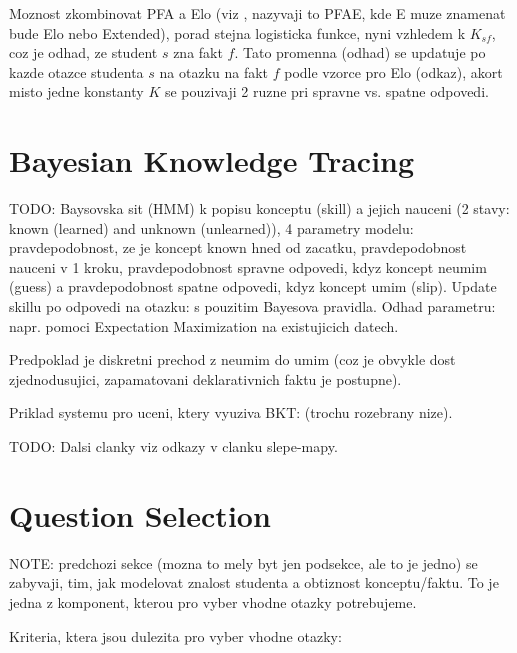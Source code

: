 \documentclass[a4paper, 12pt, twoside]{fithesis2}		%
\renewcommand{\_}{\leavevmode \kern0.0em\vbox{\hrule width0.4em}}
\begin{document}
Moznost zkombinovat PFA a Elo (viz \cite{slepe-mapy}, nazyvaji to PFAE, kde E muze znamenat bude Elo nebo Extended), porad stejna logisticka funkce, nyni vzhledem k $K_{sf}$, coz je odhad, ze student $s$ zna fakt $f$. Tato promenna (odhad) se updatuje po kazde otazce studenta $s$ na otazku na fakt $f$ podle vzorce pro Elo (odkaz), akort misto jedne konstanty $K$ se pouzivaji 2 ruzne pri spravne vs. spatne odpovedi.


\section{Bayesian Knowledge Tracing}
\label{sec:bayesian-network}

TODO: Baysovska sit (HMM) k popisu konceptu (skill) a jejich nauceni (2 stavy: known (learned) and unknown (unlearned)), 4 parametry modelu: pravdepodobnost, ze je koncept known hned od zacatku, pravdepodobnost nauceni v 1 kroku, pravdepodobnost spravne odpovedi, kdyz koncept neumim (guess) a pravdepodobnost spatne odpovedi, kdyz koncept umim (slip).
Update skillu po odpovedi na otazku: s pouzitim Bayesova pravidla.
Odhad parametru: napr. pomoci Expectation Maximization na existujicich datech.

Predpoklad je diskretni prechod z neumim do umim (coz je obvykle dost zjednodusujici, zapamatovani deklarativnich faktu je postupne).

Priklad systemu pro uceni, ktery vyuziva BKT: \cite{question-gen-adapt-bayes} (trochu rozebrany nize).

TODO: Dalsi clanky viz odkazy v clanku slepe-mapy.


\section{Question Selection}
\label{sec:question-selection}

NOTE: predchozi sekce (mozna to mely byt jen podsekce, ale to je jedno) se zabyvaji, tim, jak modelovat znalost studenta a obtiznost konceptu/faktu. To je jedna z komponent, kterou pro vyber vhodne otazky potrebujeme.

Kriteria, ktera jsou dulezita pro vyber vhodne otazky:
\end{document}
